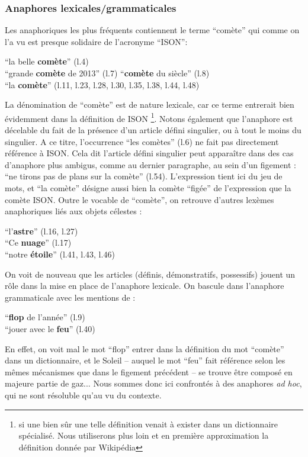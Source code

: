\documentclass[a4paper,10pt]{article}
\begin{document}
		\subsubsection{Anaphores lexicales/grammaticales} \label{anaphore}
			Les anaphoriques les plus fréquents contiennent le terme ``comète'' qui comme on l'a vu est presque solidaire de l'acronyme ``ISON'':
			\begin{center}
				\footnotesize
				\begin{minipage}{0.7\textwidth}
					``la belle \textbf{comète}'' (l.4)\\
					``grande \textbf{comète} de 2013'' (l.7)
					``\textbf{comète} du siècle'' (l.8)\\
					``la \textbf{comète}'' (l.11, l.23, l.28, l.30, l.35, l.38, l.44, l.48)
				\end{minipage}
			\end{center}
			La dénomination de ``comète'' est de nature lexicale, car ce terme entrerait bien évidemment dans la définition de ISON \footnote{si une bien sûr une telle définition venait à exister dans un dictionnaire spécialisé. Nous utiliserons plus loin et en première approximation la définition donnée par Wikipédia}. Notons également que l'anaphore est décelable du fait de la présence d'un article défini singulier, ou à tout le moins du singulier. A ce titre, l'occurrence ``les comètes'' (l.6) ne fait pas directement référence à ISON. Cela dit l'article défini singulier peut apparaître dans des cas d'anaphore plus ambigus, comme au dernier paragraphe, au sein d'un figement : ``ne tirons pas de plans sur la comète'' (l.54). L'expression tient ici du jeu de mots, et ``la comète'' désigne aussi bien la comète ``figée'' de l'expression  que la comète ISON. Outre le vocable de ``comète'', on retrouve d'autres lexèmes anaphoriques liés aux objets célestes :
			\begin{center}
				\footnotesize
				\begin{minipage}{0.7\textwidth}
					``l'\textbf{astre}'' (l.16, l.27) \\
					``Ce \textbf{nuage}'' (l.17) \\
					``notre \textbf{étoile}'' (l.41, l.43, l.46)
				\end{minipage}
			\end{center}
			On voit de nouveau que les articles (définis, démonstratifs, possessifs) jouent un rôle dans la mise en place de l'anaphore lexicale. On bascule dans l'anaphore grammaticale avec les mentions de :
			\begin{center}
				\footnotesize
				\begin{minipage}{0.7\textwidth}
					``\textbf{flop} de l'année'' (l.9) \\
					``jouer avec le \textbf{feu}'' (l.40) \\
				\end{minipage}
			\end{center}
			En effet, on voit mal le mot ``flop'' entrer dans la définition du mot ``comète'' dans un dictionnaire, et le Soleil -- auquel le mot ``feu'' fait référence selon les mêmes mécanismes que dans le figement précédent -- se trouve être composé en majeure partie de gaz... Nous sommes donc ici confrontés à des anaphores \textit{ad hoc}, qui ne sont résoluble qu'au vu du contexte.
\end{document}
